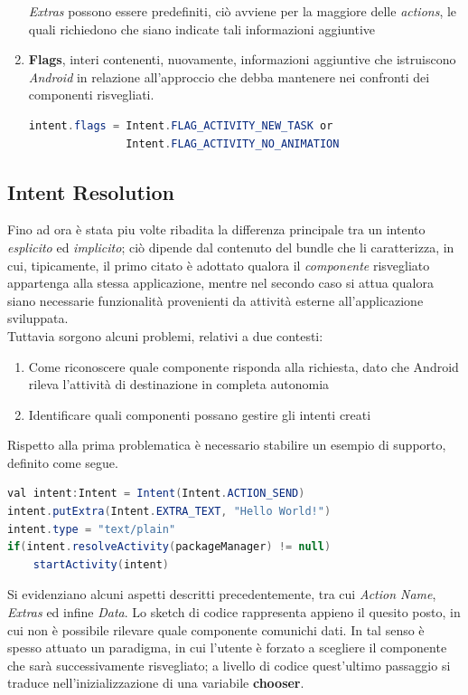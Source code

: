\documentclass{article}
\begin{document}
\begin{enumerate}
    \textit{Extras} possono essere predefiniti, ciò avviene per la maggiore delle \textit{actions}, le quali richiedono che siano indicate tali informazioni aggiuntive
    \item  \textbf{Flags}, interi contenenti, nuovamente, informazioni aggiuntive che istruiscono \textit{Android} in relazione all'approccio che debba mantenere nei confronti dei componenti risvegliati.
    \begin{lstlisting}[language=JAVA, title=Definizione del field flags]
intent.flags = Intent.FLAG_ACTIVITY_NEW_TASK or
               Intent.FLAG_ACTIVITY_NO_ANIMATION
    \end{lstlisting}
\end{enumerate}

\subsection*{Intent Resolution}
Fino ad ora è stata piu volte ribadita la differenza principale tra un intento \textit{esplicito} ed \textit{implicito}; ciò dipende dal contenuto del bundle che li caratterizza, in cui, tipicamente, il primo citato è adottato qualora il \textit{componente} risvegliato appartenga alla stessa applicazione, mentre nel secondo caso si attua qualora siano necessarie funzionalità provenienti da attività esterne all'applicazione sviluppata.\vspace*{7pt}\\
Tuttavia sorgono alcuni problemi, relativi a due contesti:
\begin{enumerate}
    \itemsep0em
    \renewcommand{\labelenumi}{-}
    \item Come riconoscere quale componente risponda alla richiesta, dato che Android rileva l'attività di destinazione in completa autonomia
    \item Identificare quali componenti possano gestire gli intenti creati
\end{enumerate}
Rispetto alla prima problematica è necessario stabilire un esempio di supporto, definito come segue.
\begin{lstlisting}[language=JAVA, title=Esempio di creazione di un intent implicito]
val intent:Intent = Intent(Intent.ACTION_SEND)
intent.putExtra(Intent.EXTRA_TEXT, "Hello World!")
intent.type = "text/plain"
if(intent.resolveActivity(packageManager) != null) 
    startActivity(intent)

\end{lstlisting}
Si evidenziano alcuni aspetti descritti precedentemente, tra cui \textit{Action Name}, \textit{Extras} ed infine \textit{Data}. Lo sketch di codice rappresenta appieno il quesito posto, in cui non è possibile rilevare quale componente comunichi dati. In tal senso è spesso attuato un paradigma, in cui l'utente è forzato a scegliere il componente che sarà successivamente risvegliato; a livello di codice quest'ultimo passaggio si traduce nell'inizializzazione di una variabile \textbf{chooser}.
\end{document}
